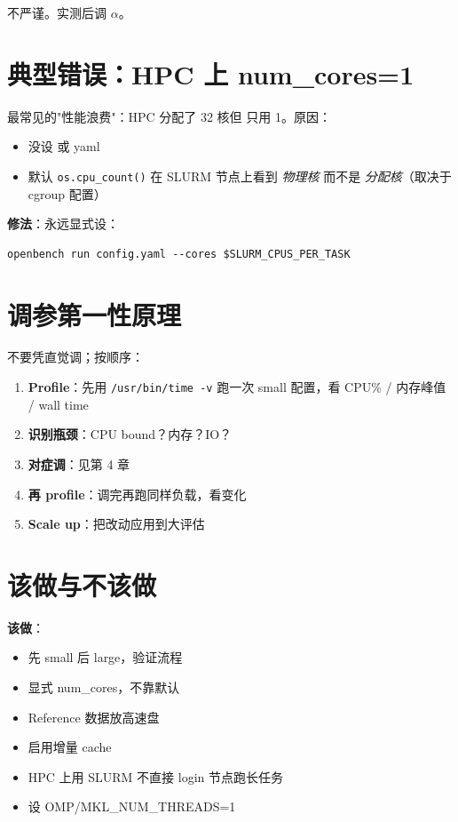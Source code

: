不严谨。实测后调 \(\alpha\)。

\section{典型错误：HPC 上 num\_cores=1}

最常见的"性能浪费"：HPC 分配了 32 核但 \openbench{} 只用 1。原因：

\begin{itemize}
  \item 没设  或 yaml 
  \item 默认 \texttt{os.cpu\_count()} 在 SLURM 节点上看到 \emph{物理核} 而不是 \emph{分配核}（取决于 cgroup 配置）
\end{itemize}

\textbf{修法}：永远显式设：

\begin{verbatim}
openbench run config.yaml --cores $SLURM_CPUS_PER_TASK
\end{verbatim}

\section{调参第一性原理}

不要凭直觉调；按顺序：

\begin{enumerate}
  \item \textbf{Profile}：先用 \texttt{/usr/bin/time -v} 跑一次 small 配置，看 CPU\% / 内存峰值 / wall time
  \item \textbf{识别瓶颈}：CPU bound？内存？IO？
  \item \textbf{对症调}：见第 4 章
  \item \textbf{再 profile}：调完再跑同样负载，看变化
  \item \textbf{Scale up}：把改动应用到大评估
\end{enumerate}

\section{该做与不该做}

\textbf{该做}：

\begin{itemize}
  \item 先 small 后 large，验证流程
  \item 显式 num\_cores，不靠默认
  \item Reference 数据放高速盘
  \item 启用增量 cache
  \item HPC 上用 SLURM 不直接 login 节点跑长任务
  \item 设 OMP/MKL\_NUM\_THREADS=1
\end{itemize}

